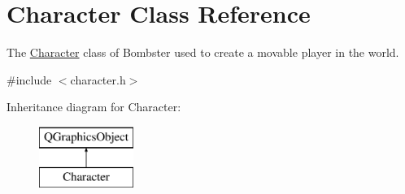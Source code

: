 \hypertarget{class_character}{\section{Character Class Reference}
\label{class_character}
}


The \hyperlink{class_character}{Character} class of Bombster used to create a movable player in the world.  




{\ttfamily \#include $<$character.\-h$>$}

Inheritance diagram for Character\-:\begin{figure}[H]
\begin{center}
\leavevmode
\includegraphics[height=2.000000cm]{class_character}
\end{center}
\end{figure}
